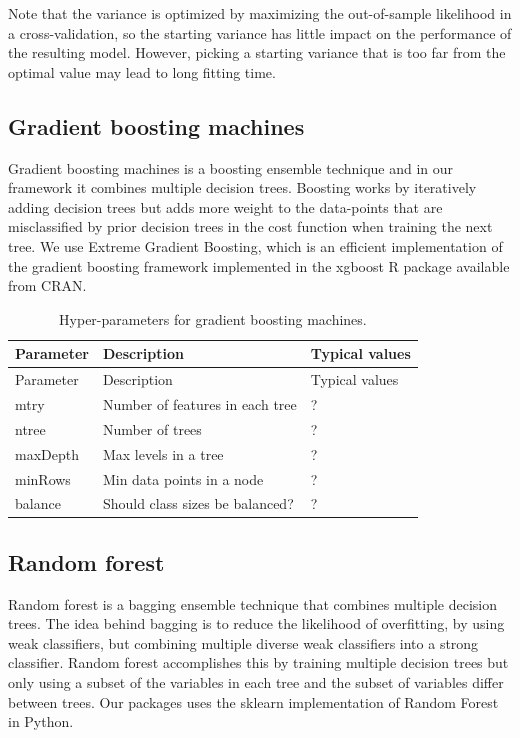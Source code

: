 \documentclass[11pt]{book}
\theoremstyle{definition}
\theoremstyle{definition}
\theoremstyle{definition}
\theoremstyle{remark}
\begin{document}
Note that the variance is optimized by maximizing the out-of-sample likelihood in a cross-validation, so the starting variance has little impact on the performance of the resulting model. However, picking a starting variance that is too far from the optimal value may lead to long fitting time.   

\hypertarget{gradient-boosting-machines}{%
\subsection{Gradient boosting machines}\label{gradient-boosting-machines}}

Gradient boosting machines is a boosting ensemble technique and in our framework it combines multiple decision trees. Boosting works by iteratively adding decision trees but adds more weight to the data-points that are misclassified by prior decision trees in the cost function when training the next tree. We use Extreme Gradient Boosting, which is an efficient implementation of the gradient boosting framework implemented in the xgboost R package available from CRAN.  

\begin{longtable}[]{@{}lll@{}}
\caption{\label{tab:gbmParameters} Hyper-parameters for gradient boosting machines.}\tabularnewline
\toprule
Parameter & Description & Typical values\tabularnewline
\midrule
\endfirsthead
\toprule
Parameter & Description & Typical values\tabularnewline
\midrule
\endhead
mtry & Number of features in each tree & ?\tabularnewline
ntree & Number of trees & ?\tabularnewline
maxDepth & Max levels in a tree & ?\tabularnewline
minRows & Min data points in a node & ?\tabularnewline
balance & Should class sizes be balanced? & ?\tabularnewline
\bottomrule
\end{longtable}

\hypertarget{random-forest}{%
\subsection{Random forest}\label{random-forest}}

Random forest is a bagging ensemble technique that combines multiple decision trees. The idea behind bagging is to reduce the likelihood of overfitting, by using weak classifiers, but combining multiple diverse weak classifiers into a strong classifier. Random forest accomplishes this by training multiple decision trees but only using a subset of the variables in each tree and the subset of variables differ between trees. Our packages uses the sklearn implementation of Random Forest in Python.   
\end{document}
